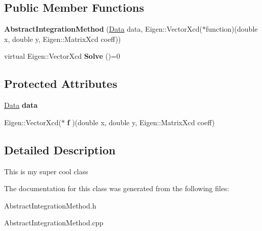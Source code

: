 \subsection*{Public Member Functions}
\begin{DoxyCompactItemize}
\item 
\mbox{\label{classAbstractIntegrationMethod_a2b3a0208c99564d496e27b383fc4d96f}} 
{\bfseries Abstract\+Integration\+Method} (\hyperlink{structData}{Data} data, Eigen\+::\+Vector\+Xcd($\ast$function)(double x, double y, Eigen\+::\+Matrix\+Xcd coeff))
\item 
\mbox{\label{classAbstractIntegrationMethod_af76e5bdce7d0b139d07e920fa29c1c34}} 
virtual Eigen\+::\+Vector\+Xcd {\bfseries Solve} ()=0
\end{DoxyCompactItemize}
\subsection*{Protected Attributes}
\begin{DoxyCompactItemize}
\item 
\mbox{\label{classAbstractIntegrationMethod_a534b5ff7dfbccc1332cfbe66e817b389}} 
\hyperlink{structData}{Data} {\bfseries data}
\item 
\mbox{\label{classAbstractIntegrationMethod_a4de4f7ee55737b4f05f2b02649bf5ea0}} 
Eigen\+::\+Vector\+Xcd($\ast$ {\bfseries f} )(double x, double y, Eigen\+::\+Matrix\+Xcd coeff)
\end{DoxyCompactItemize}


\subsection{Detailed Description}
This is my super cool class 

The documentation for this class was generated from the following files\+:\begin{DoxyCompactItemize}
\item 
Abstract\+Integration\+Method.\+h\item 
Abstract\+Integration\+Method.\+cpp\end{DoxyCompactItemize}
